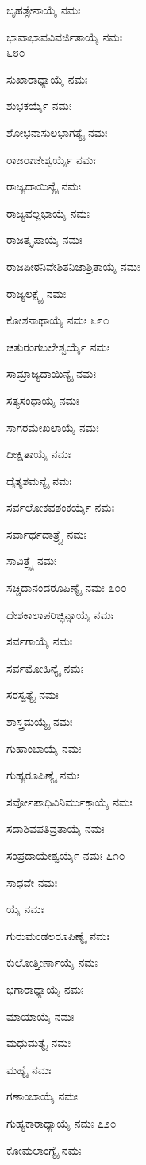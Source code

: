 ಬೃಹತ್ಸೇನಾಯೈ ನಮಃ

ಭಾವಾಭಾವವಿವರ್ಜಿತಾಯೈ ನಮಃ\\\num{೬೮೦}

ಸುಖಾರಾಧ್ಯಾಯೈ ನಮಃ

ಶುಭಕರ್ಯೈ ನಮಃ

ಶೋಭನಾಸುಲಭಾಗತ್ಯೈ ನಮಃ

ರಾಜರಾಜೇಶ್ವರ್ಯೈ ನಮಃ

ರಾಜ್ಯದಾಯಿನ್ಯೈ ನಮಃ

ರಾಜ್ಯವಲ್ಲಭಾಯೈ ನಮಃ

ರಾಜತ್ಕೃಪಾಯೈ ನಮಃ

ರಾಜಪೀಠನಿವೇಶಿತನಿಜಾಶ್ರಿತಾಯೈ ನಮಃ

ರಾಜ್ಯಲಕ್ಷ್ಯೈ ನಮಃ

ಕೋಶನಾಥಾಯೈ ನಮಃ \num{೬೯೦}

ಚತುರಂಗಬಲೇಶ್ವರ್ಯೈ ನಮಃ

ಸಾಮ್ರಾಜ್ಯದಾಯಿನ್ಯೈ ನಮಃ

ಸತ್ಯಸಂಧಾಯೈ ನಮಃ

ಸಾಗರಮೇಖಲಾಯೈ ನಮಃ

ದೀಕ್ಷಿತಾಯೈ ನಮಃ

ದೈತ್ಯಶಮನ್ಯೈ ನಮಃ

ಸರ್ವಲೋಕವಶಂಕರ್ಯೈ ನಮಃ

ಸರ್ವಾರ್ಥದಾತ್ರ್ಯೈ ನಮಃ

ಸಾವಿತ್ರ್ಯೈ ನಮಃ

ಸಚ್ಚಿದಾನಂದರೂಪಿಣ್ಯೈ ನಮಃ \num{೭೦೦}

ದೇಶಕಾಲಾಪರಿಚ್ಛಿನ್ನಾಯೈ ನಮಃ

ಸರ್ವಗಾಯೈ ನಮಃ

ಸರ್ವಮೋಹಿನ್ಯೈ ನಮಃ

ಸರಸ್ವತ್ಯೈ ನಮಃ

ಶಾಸ್ತ್ರಮಯ್ಯೈ ನಮಃ

ಗುಹಾಂಬಾಯೈ ನಮಃ

ಗುಹ್ಯರೂಪಿಣ್ಯೈ ನಮಃ

ಸರ್ವೋಪಾಧಿವಿನಿರ್ಮುಕ್ತಾಯೈ ನಮಃ

ಸದಾಶಿವಪತಿವ್ರತಾಯೈ ನಮಃ

ಸಂಪ್ರದಾಯೇಶ್ವರ್ಯೈ ನಮಃ \num{೭೧೦}

ಸಾಧವೇ ನಮಃ

ಯೈ ನಮಃ

ಗುರುಮಂಡಲರೂಪಿಣ್ಯೈ ನಮಃ

ಕುಲೋತ್ತೀರ್ಣಾಯೈ ನಮಃ

ಭಗಾರಾಧ್ಯಾಯೈ ನಮಃ

ಮಾಯಾಯೈ ನಮಃ

ಮಧುಮತ್ಯೈ ನಮಃ

ಮಹ್ಯೈ ನಮಃ

ಗಣಾಂಬಾಯೈ ನಮಃ

ಗುಹ್ಯಕಾರಾಧ್ಯಾಯೈ ನಮಃ \num{೭೨೦}

ಕೋಮಲಾಂಗ್ಯೈ ನಮಃ

